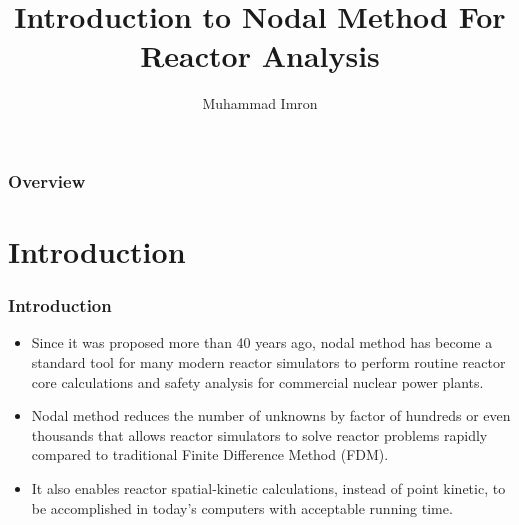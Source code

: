 \documentclass{beamer}
\title[]{Introduction to Nodal Method For Reactor Analysis} %
\author{Muhammad Imron} %
\begin{document}
\begin{frame}
\titlepage %
\end{frame}

\begin{frame}
\frametitle{Overview} %
\tableofcontents %
\end{frame}


\section{Introduction} %


\begin{frame}
\frametitle{Introduction}
\begin{itemize}
\item Since it was proposed more than 40 years ago, nodal method has become a standard tool for many modern reactor simulators to perform routine reactor core calculations and safety analysis for commercial nuclear power plants.
\item Nodal method reduces the number of unknowns by factor of hundreds or even thousands that allows reactor simulators to solve reactor problems rapidly compared to traditional Finite Difference Method (FDM).
\item It also enables reactor spatial-kinetic calculations, instead of point kinetic, to be accomplished in today’s computers with acceptable running time.
\end{itemize}
\end{frame}
\end{document}

